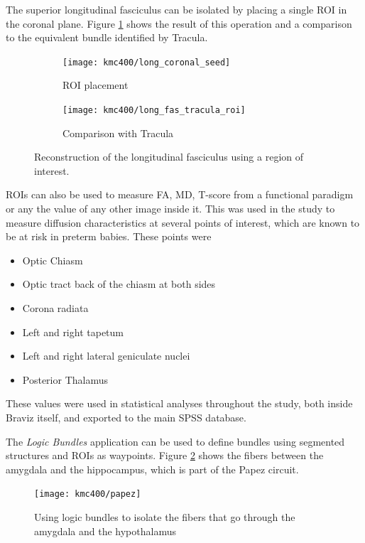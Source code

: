 The superior longitudinal fasciculus can be isolated by placing a single ROI in the coronal plane. Figure \ref{fig_long_fasc} shows the result of this operation and a comparison to the equivalent bundle identified by Tracula. 

\begin{figure}
\centering
	\begin{subfigure}{0.45\textwidth}
		\texttt{[image: kmc400/long\_coronal\_seed]}
		\caption{ROI placement}
	\end{subfigure}
	\begin{subfigure}{0.45\textwidth}
\texttt{[image: kmc400/long\_fas\_tracula\_roi]}
		\caption{Comparison with Tracula}
	\end{subfigure}

\caption{Reconstruction of the longitudinal fasciculus using a region of interest.
\label{fig_long_fasc}}
\end{figure} 

ROIs can also be used to measure FA, MD, T-score from a functional paradigm or any the value of any other image inside it. This was used in the study to measure diffusion characteristics at several points of interest, which are known to be at risk in preterm babies. These points were

\begin{itemize}
\item Optic Chiasm
\item Optic tract back of the chiasm at both sides
\item Corona radiata
\item Left and right tapetum
\item Left and right lateral geniculate nuclei
\item Posterior Thalamus
\end{itemize}
These values were used in statistical analyses throughout the study, both inside Braviz itself, and exported to the main SPSS database.

The \emph{Logic Bundles} application can be used to define bundles using segmented structures and ROIs as waypoints. Figure \ref{fig_papez} shows the fibers between the amygdala and the hippocampus, which is part of the Papez circuit. 

\begin{figure}
\centering
\texttt{[image: kmc400/papez]}
\caption{Using logic bundles to isolate the fibers that go through the amygdala and the hypothalamus
\label{fig_papez}}
\end{figure} 

